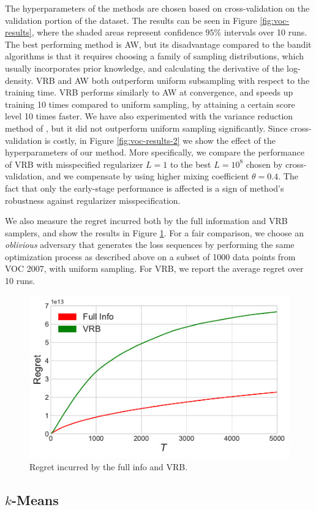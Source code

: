         
The hyperparameters of the methods are chosen based on cross-validation on the validation portion of the dataset. The results can be seen in Figure \ref{fig:voc-results}, where the shaded areas represent confidence $95\%$ intervals over 10 runs. The best performing method is AW, but its disadvantage compared to the bandit algorithms is that it requires choosing a family of sampling distributions, which usually incorporates prior knowledge, and calculating the derivative of the log-density. VRB and AW both outperform uniform subsampling with respect to the training time.  VRB performs similarly to AW at convergence, and speeds up training 10 times compared to uniform sampling, by attaining a certain score level 10 times faster. We have also experimented with the variance reduction method of \cite{pmlr-v70-namkoong17a}, but it did not outperform uniform sampling significantly. Since cross-validation is costly, in Figure \ref{fig:voc-results-2} we show the effect of the hyperparameters of our method. More specifically, we compare the performance of VRB with misspecified regularizer $L=1$ to the best $L=10^8$ chosen by cross-validation, and we compensate by using higher mixing coefficient $\theta=0.4$. The fact that only the early-stage performance is affected is a sign of method's robustness against regularizer misspecification.

We also measure the regret incurred both by the full information and VRB samplers, and show the results in Figure \ref{fig:regret}. For a fair comparison, we choose an \emph{oblivious} adversary that generates the loss sequences by performing the same optimization process as described above on a subset of 1000 data points from VOC 2007, with uniform sampling. For VRB, we report the average regret over 10 runs. 
\begin{figure}[h]

		\centering
		\includegraphics[width=0.5\linewidth]{figures/regret.pdf}
		\caption{Regret incurred by the full info and VRB.}
		\label{fig:regret}
\end{figure}


\subsection{$k$-Means}


